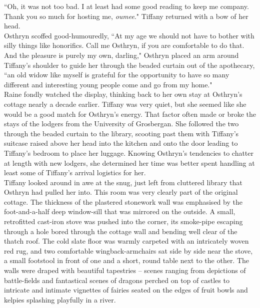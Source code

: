 ``Oh, it was not too bad. I at least had some good reading to keep me company. Thank you so much for hosting me, \textit{oumee}." Tiffany returned with a bow of her head.\\
Osthryn scoffed good-humouredly, ``At my age we should not have to bother with silly things like honorifics. Call me Osthryn, if you are comfortable to do that. And the pleasure is purely my own, darling," Osthryn placed an arm around Tiffany's shoulder
to guide her through the beaded curtain out of the apothecary, ``an old widow like myself is grateful for the opportunity to have so many different and interesting young people come and go from my home."\\

Raine fondly watched the display, thinking back to her own stay at Osthryn's cottage nearly a decade earlier.
Tiffany was very quiet, but she seemed like she would be a good match for Osthryn's energy. 
That factor often made or broke the stays of the lodgers from the University of Grosbergan.
She followed the two through the beaded curtain to the library, scooting past them with Tiffany's suitcase raised above her head into the kitchen and onto the door leading to Tiffany's bedroom to place her luggage. 
Knowing Osthryn's tendencies to chatter at length with new lodgers, she determined her time was better spent handling at least some of Tiffany's arrival logistics for her.\\

Tiffany looked around in awe at the snug, just left from cluttered library that Osthryn had pulled her into. 
This room was very clearly part of the original cottage. 
The thickness of the plastered stonework wall was emphasised by the foot-and-a-half deep window-sill that was mirrored on the outside.
A small, retrofitted cast-iron stove was pushed into the corner, its smoke-pipe escaping through a hole bored through the cottage wall and bending well clear of the thatch roof.
The cold slate floor was warmly carpeted with an intricately woven red rug, and two comfortable wingback-armchairs sat side by side near the stove, a small footstool in front of one and a short, round table next to the other.
The walls were draped with beautiful tapestries -- scenes ranging from depictions of battle-fields and fantastical scenes of dragons perched on top of castles to intricate and intimate vignettes of fairies seated on the edges of fruit bowls and kelpies splashing playfully in a river.\\

